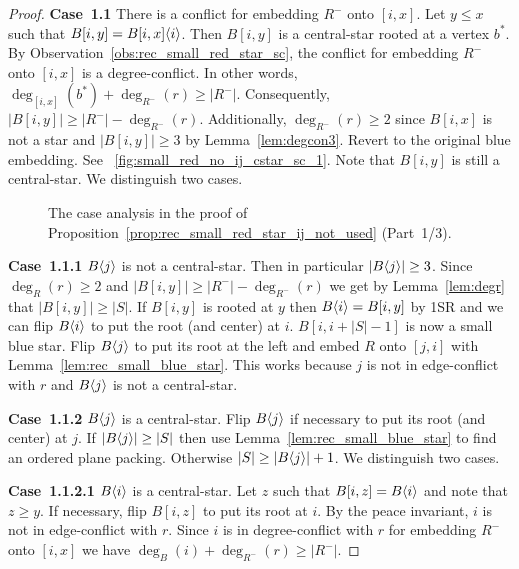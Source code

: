 \documentclass[11pt,a4paper,colorlinks=true,urlcolor=blue,citecolor=red]{article}
\theoremstyle{plain}
\newcommand{\case}[1]{\par\vspace{.5\baselineskip}\noindent\textbf{\sffamily Case~#1}}
\begin{document}
\begin{proof}
  \case{1.1} There is a conflict for embedding $R^-$ onto $[i,x]$.  Let
  $y\leq x$ such that $B[i,y]=B{[i,x]}\langle{i}\rangle$. Then $B[i,y]$ is a
  central-star rooted at a vertex $b^*$. By
  Observation~\ref{obs:rec_small_red_star_sc}, the conflict for
  embedding $R^-$ onto $[i,x]$ is a degree-conflict. In other words,
  $\deg_{[i,x]}(b^*)+\deg_{R^-}(r)\geq|R^-|$. Consequently,
  $|B[i,y]|\geq|R^-|-\deg_{R^-}(r)$. Additionally, $\deg_{R^-}(r)\geq 2$
  since $B[i,x]$ is not a star and $|B[i,y]|\geq3$ by
  Lemma~\ref{lem:degcon3}. Revert to the original blue embedding.  See
  \figurename~\ref{fig:small_red_no_ij_cstar_sc_1}. Note that $B[i,y]$
  is still a central-star.  We distinguish two cases.

  \begin{figure}[b]
    \centering\hfil {}\hfil {}\hfil {}\hfil \label{fig:small_red_no_ij_1}
    \caption{The case analysis in the proof of
      Proposition~\ref{prop:rec_small_red_star_ij_not_used} (Part~1/3).}
  \end{figure}

  \case{1.1.1} $B\langle{j}\rangle$ is not a central-star. Then in particular
  $|B\langle{j}\rangle|\geq 3$. Since $\deg_R(r)\geq2$ and
  $|B[i,y]|\geq|R^-|-\deg_{R^-}(r)$ we get by Lemma~\ref{lem:degr} that
  $|B[i,y]|\geq|S|$. If $B[i,y]$ is rooted at $y$ then
  $B\langle{i}\rangle=B[i,y]$ by 1SR and we can flip $B\langle{i}\rangle$ to put the
  root (and center) at $i$. $B[i,i+|S|-1]$ is now a small blue star.
  Flip $B\langle{j}\rangle$ to put its root at the left and embed $R$ onto
  $[j,i]$ with Lemma~\ref{lem:rec_small_blue_star}. This works because
  $j$ is not in edge-conflict with $r$ and $B\langle{j}\rangle$ is not a
  central-star.

  \case{1.1.2} $B\langle{j}\rangle$ is a central-star. Flip $B\langle{j}\rangle$ if
  necessary to put its root (and center) at $j$. If
  $|B\langle{j}\rangle|\geq|S|$ then use Lemma~\ref{lem:rec_small_blue_star} to
  find an ordered plane packing. Otherwise $|S|\geq|B\langle{j}\rangle|+1$. We
  distinguish two cases.

  \case{1.1.2.1} $B\langle{i}\rangle$ is a central-star. Let $z$ such that
  $B[i,z]=B\langle{i}\rangle$ and note that $z\geq y$. If necessary, flip
  $B[i,z]$ to put its root at $i$. By the peace invariant, $i$ is not in
  edge-conflict with $r$. Since $i$ is in degree-conflict with $r$ for
  embedding $R^-$ onto $[i,x]$ we have $\deg_B(i)+\deg_{R^-}(r)\geq
  |R^-|$.


\end{proof}
\end{document}
